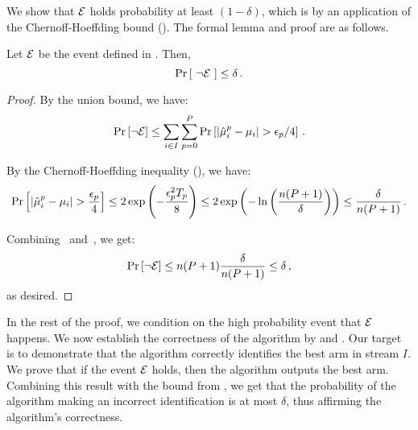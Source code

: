 We show that $\mathcal{E}$ holds probability at least $(1-\delta)$, which is by an application of the Chernoff-Hoeffding bound (). The formal lemma and proof are as follows.
\begin{lemma}\label{lem:bound-E}
    Let \(\mathcal{E}\) be the event defined in . Then, \[\operatorname*{\textnormal{Pr}}\left[~\neg \mathcal{E}~\right] \le \delta \,.\]
\end{lemma}
\begin{proof}
    By the union bound, we have:
    \begin{align}\label{eq:event-sum}
        \operatorname*{\textnormal{Pr}}\left[\neg {\mathcal{E}}\right] \le \sum_{i \in I} \sum_{p = 0}^{P} \operatorname*{\textnormal{Pr}}\left[\left| \hat{\mu}^p_i - \mu_i \right| > \epsilon_p/4\right]\,.
    \end{align}
    
    By the Chernoff-Hoeffding inequality (), we have:
    \begin{align}\label{eq:event-single}
        \operatorname*{\textnormal{Pr}}\left[\left| \hat{\mu}^p_i - \mu_i \right| > \frac{\epsilon_p}{4} \right] \le 2 \exp\left(-\frac{\epsilon_p^2 T_p}{8}\right) \le 2\exp\left(-\ln\left(\frac{n(P + 1)}{\delta}\right)\right) \le \frac{\delta}{n (P + 1)}\,.
    \end{align}
    
    Combining~ and~, we get:
    \begin{equation*}
        \operatorname*{\textnormal{Pr}}\left[\neg \mathcal{E}\right] \le n (P + 1) \frac{\delta}{n(P + 1)} \le \delta\, ,
    \end{equation*}
    as desired.
\end{proof}

In the rest of the proof, we condition on the high probability event that $\mathcal{E}$ happens. We now establish the correctness of the algorithm by  and . Our target is to demonstrate that the algorithm correctly identifies the best arm in stream \(I\). We prove that if the event \(\mathcal{E}\) holds, then the algorithm outputs the best arm. Combining this result with the bound from , we get that the probability of the algorithm making an incorrect identification is at most \(\delta\), thus affirming the algorithm's correctness.

